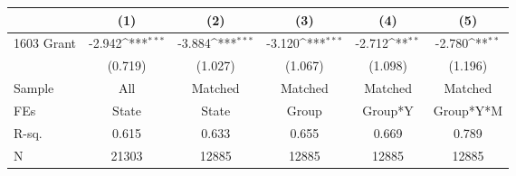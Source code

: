 {
\def\sym#1{\ifmmode^{#1}\else\(^{#1}\)\fi}
\begin{tabular}{l*{5}{c}}
\toprule
                    &\multicolumn{1}{c}{(1)}         &\multicolumn{1}{c}{(2)}         &\multicolumn{1}{c}{(3)}         &\multicolumn{1}{c}{(4)}         &\multicolumn{1}{c}{(5)}         \\
\midrule
1603 Grant          &      -2.942\sym{***}&      -3.884\sym{***}&      -3.120\sym{***}&      -2.712\sym{**} &      -2.780\sym{**} \\
                    &     (0.719)         &     (1.027)         &     (1.067)         &     (1.098)         &     (1.196)         \\
\midrule
Sample              &         All         &     Matched         &     Matched         &     Matched         &     Matched         \\
FEs                 &       State         &       State         &       Group         &     Group*Y         &   Group*Y*M         \\
R-sq.               &       0.615         &       0.633         &       0.655         &       0.669         &       0.789         \\
N                   &       21303         &       12885         &       12885         &       12885         &       12885         \\
\bottomrule
\end{tabular}
}
